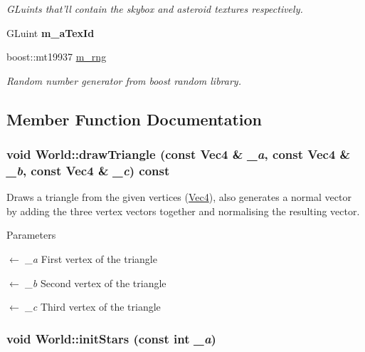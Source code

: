 \begin{DoxyCompactItemize}
\begin{DoxyCompactList}\small\item\em GLuints that'll contain the skybox and asteroid textures respectively. \item\end{DoxyCompactList}\item 
\hypertarget{classWorld_a270df47c2ee895db634b7b13304ee6c7}{
GLuint {\bfseries m\_\-aTexId}}
\label{classWorld_a270df47c2ee895db634b7b13304ee6c7}

\item 
\hypertarget{classWorld_a7cff9b24861c9edd4da9890f4935377f}{
boost::mt19937 \hyperlink{classWorld_a7cff9b24861c9edd4da9890f4935377f}{m\_\-rng}}
\label{classWorld_a7cff9b24861c9edd4da9890f4935377f}

\begin{DoxyCompactList}\small\item\em Random number generator from boost random library. \item\end{DoxyCompactList}\end{DoxyCompactItemize}


\subsection{Member Function Documentation}
\hypertarget{classWorld_ac4ef03315e97218465a6fb29d6cded14}{
\subsubsection[{drawTriangle}]{\setlength{\rightskip}{0pt plus 5cm}void World::drawTriangle (const {\bf Vec4} \& {\em \_\-a}, \/  const {\bf Vec4} \& {\em \_\-b}, \/  const {\bf Vec4} \& {\em \_\-c}) const}}
\label{classWorld_ac4ef03315e97218465a6fb29d6cded14}


Draws a triangle from the given vertices (\hyperlink{classVec4}{Vec4}), also generates a normal vector by adding the three vertex vectors together and normalising the resulting vector. 
\begin{DoxyParams}{Parameters}
\item[\mbox{$\leftarrow$} {\em \_\-a}]First vertex of the triangle \item[\mbox{$\leftarrow$} {\em \_\-b}]Second vertex of the triangle \item[\mbox{$\leftarrow$} {\em \_\-c}]Third vertex of the triangle \end{DoxyParams}
\hypertarget{classWorld_a6dd84a97b1bd38e94453cc31edcada8d}{
\subsubsection[{initStars}]{\setlength{\rightskip}{0pt plus 5cm}void World::initStars (const int {\em \_\-a})}}
\label{classWorld_a6dd84a97b1bd38e94453cc31edcada8d}


